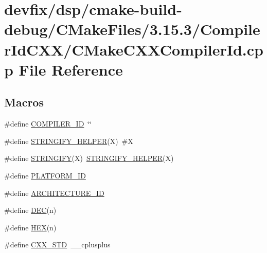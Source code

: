 \hypertarget{dsp_2cmake-build-debug_2CMakeFiles_23_815_83_2CompilerIdCXX_2CMakeCXXCompilerId_8cpp}{}\section{devfix/dsp/cmake-\/build-\/debug/\+C\+Make\+Files/3.15.3/\+Compiler\+Id\+C\+X\+X/\+C\+Make\+C\+X\+X\+Compiler\+Id.cpp File Reference}
\label{dsp_2cmake-build-debug_2CMakeFiles_23_815_83_2CompilerIdCXX_2CMakeCXXCompilerId_8cpp}
\subsection*{Macros}
\begin{DoxyCompactItemize}
\item 
\#define \hyperlink{dsp_2cmake-build-debug_2CMakeFiles_23_815_83_2CompilerIdCXX_2CMakeCXXCompilerId_8cpp_a81dee0709ded976b2e0319239f72d174}{C\+O\+M\+P\+I\+L\+E\+R\+\_\+\+ID}~\char`\"{}\char`\"{}
\item 
\#define \hyperlink{dsp_2cmake-build-debug_2CMakeFiles_23_815_83_2CompilerIdCXX_2CMakeCXXCompilerId_8cpp_a2ae9b72bb13abaabfcf2ee0ba7d3fa1d}{S\+T\+R\+I\+N\+G\+I\+F\+Y\+\_\+\+H\+E\+L\+P\+ER}(X)~\#X
\item 
\#define \hyperlink{dsp_2cmake-build-debug_2CMakeFiles_23_815_83_2CompilerIdCXX_2CMakeCXXCompilerId_8cpp_a43e1cad902b6477bec893cb6430bd6c8}{S\+T\+R\+I\+N\+G\+I\+FY}(X)~\hyperlink{net_2cmake-build-debug_2CMakeFiles_23_815_83_2CompilerIdCXX_2CMakeCXXCompilerId_8cpp_a2ae9b72bb13abaabfcf2ee0ba7d3fa1d}{S\+T\+R\+I\+N\+G\+I\+F\+Y\+\_\+\+H\+E\+L\+P\+ER}(X)
\item 
\#define \hyperlink{dsp_2cmake-build-debug_2CMakeFiles_23_815_83_2CompilerIdCXX_2CMakeCXXCompilerId_8cpp_adbc5372f40838899018fadbc89bd588b}{P\+L\+A\+T\+F\+O\+R\+M\+\_\+\+ID}
\item 
\#define \hyperlink{dsp_2cmake-build-debug_2CMakeFiles_23_815_83_2CompilerIdCXX_2CMakeCXXCompilerId_8cpp_aba35d0d200deaeb06aee95ca297acb28}{A\+R\+C\+H\+I\+T\+E\+C\+T\+U\+R\+E\+\_\+\+ID}
\item 
\#define \hyperlink{dsp_2cmake-build-debug_2CMakeFiles_23_815_83_2CompilerIdCXX_2CMakeCXXCompilerId_8cpp_ad1280362da42492bbc11aa78cbf776ad}{D\+EC}(n)
\item 
\#define \hyperlink{dsp_2cmake-build-debug_2CMakeFiles_23_815_83_2CompilerIdCXX_2CMakeCXXCompilerId_8cpp_a46d5d95daa1bef867bd0179594310ed5}{H\+EX}(n)
\item 
\#define \hyperlink{dsp_2cmake-build-debug_2CMakeFiles_23_815_83_2CompilerIdCXX_2CMakeCXXCompilerId_8cpp_a34cc889e576a1ae6c84ae9e0a851ba21}{C\+X\+X\+\_\+\+S\+TD}~\+\_\+\+\_\+cplusplus
\end{DoxyCompactItemize}
